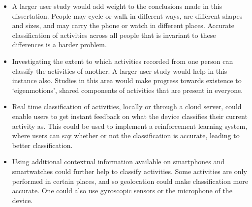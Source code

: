     \begin{itemize}
      \item A larger user study would add weight to the conclusions made in this dissertation. People may cycle or walk in different ways, are different shapes and sizes, and may carry the phone or watch in different places. Accurate classification of activities across all people that is invariant to these differences is a harder problem.
      \item Investigating the extent to which activities recorded from one person can classify the activities of another. A larger user study would help in this instance also. Studies in this area would make progress towards existence to `eigenmotions', shared components of activities that are present in everyone.
      \item Real time classification of activities, locally or through a cloud server, could enable users to get instant feedback on what the device classifies their current activity as. This could be used to implement a reinforcement learning system, where users can say whether or not the classification is accurate, leading to better classification.
      \item Using additional contextual information available on smartphones and smartwatches could further help to classify activities. Some activities are only performed in certain places, and so geolocation could make classification more accurate. One could also use gyroscopic sensors or the microphone of the device.
    \end{itemize}
    